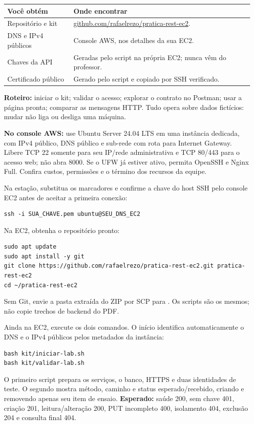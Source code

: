 \begin{tabularx}{\linewidth}{@{}lY@{}}\toprule
Você obtém & Onde encontrar \\\midrule
Repositório e kit & \href{https://github.com/rafaelrezo/pratica-rest-ec2}{github.com/rafaelrezo/pratica-rest-ec2}.\\
DNS e IPv4 públicos & Console AWS, nos detalhes da sua EC2.\\
Chaves da API & Geradas pelo script na própria EC2; nunca vêm do professor.\\
Certificado público & Gerado pelo script e copiado por SSH verificado.\\\bottomrule
\end{tabularx}
\textbf{Roteiro:} iniciar o kit; validar o acesso; explorar o contrato no Postman; usar a página pronta; comparar as mensagens HTTP. Tudo opera sobre dados fictícios: mudar  não liga ou desliga uma máquina.

\textbf{No console AWS:} use Ubuntu Server 24.04 LTS em uma instância dedicada, com IPv4 público, DNS público e sub-rede com rota para Internet Gateway. Libere TCP 22 somente para seu IP/rede administrativa e TCP 80/443 para o acesso web; não abra 8000. Se o UFW já estiver ativo, permita OpenSSH e Nginx Full. Confira custos, permissões e o término dos recursos da equipe.

Na estação, substitua os marcadores e confirme a chave do host SSH pelo console EC2 antes de aceitar a primeira conexão:
\begin{lstlisting}
ssh -i SUA_CHAVE.pem ubuntu@SEU_DNS_EC2
\end{lstlisting}
Na EC2, obtenha o repositório pronto:
\begin{lstlisting}
sudo apt update
sudo apt install -y git
git clone https://github.com/rafaelrezo/pratica-rest-ec2.git pratica-rest-ec2
cd ~/pratica-rest-ec2
\end{lstlisting}
Sem Git, envie a pasta  extraída do ZIP por SCP para . Os scripts são os mesmos; não copie trechos de backend do PDF.

Ainda na EC2, execute os dois comandos. O início identifica automaticamente o DNS e o IPv4 públicos pelos metadados da instância:
\begin{lstlisting}
bash kit/iniciar-lab.sh
bash kit/validar-lab.sh
\end{lstlisting}
O primeiro script prepara os serviços, o banco, HTTPS e duas identidades de teste. O segundo mostra método, caminho e status esperado/recebido, criando e removendo apenas seu item de ensaio. \textbf{Esperado:} saúde 200, sem chave 401, criação 201, leitura/alteração 200, PUT incompleto 400, isolamento 404, exclusão 204 e consulta final 404.

